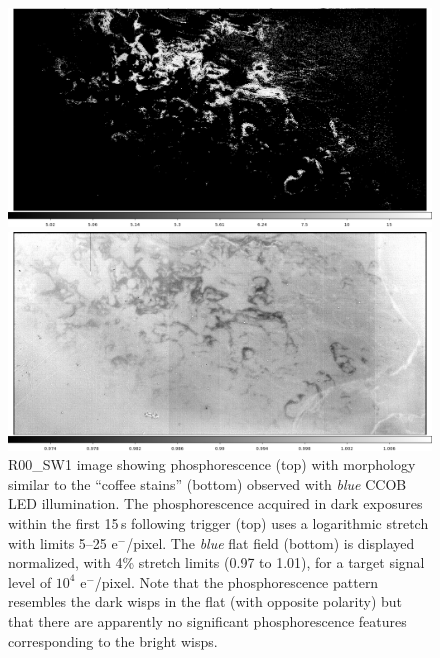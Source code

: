 \begin{figure}
\centering
\begin{minipage}{1.0\textwidth}    
  \centering
  \includegraphics[width=.95\linewidth]{figures/phosphorescence-survey/stains_phos.png}    
\end{minipage}
\begin{minipage}{1.0\textwidth}
  \centering
  \includegraphics[width=.95\linewidth]{figures/phosphorescence-survey/stains_abs.png}
\end{minipage}
\caption{R00\_SW1 image showing phosphorescence (top) with morphology similar to the ``coffee stains'' (bottom) observed with {\it blue} CCOB LED illumination. The phosphorescence acquired in dark exposures within the first 15\,s following trigger (top) uses a logarithmic stretch with limits 5--25 e$^-$/pixel. The {\it blue} flat field (bottom) is displayed normalized, with 4\% stretch limits (0.97 to 1.01), for a target signal level of $10^4$ e$^-$/pixel. Note that the phosphorescence pattern resembles the dark wisps in the flat (with opposite polarity) but that there are apparently no significant phosphorescence features corresponding to the bright wisps.}
\label{fig:phos:stains}
\end{figure}

